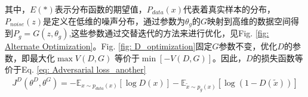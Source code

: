 \documentclass[letterpaper,12pt]{article}
\begin{document}
	其中，$E(*)$表示分布函数的期望值，$P_{data}(x)$代表着真实样本的分布，$P_{noise}(z)$是定义在低维的噪声分布，通过参数为$\theta_{g}$的$G$映射到高维的数据空间得到$P_g=G(z,\theta_{g})$,这些参数通过交替迭代的方法来进行优化，见Fig. \ref{fig: Alternate Optimization}。Fig. \ref{fig: D_optimization}固定$G$参数不变，优化$D$的参数，即最大化$\max V\left( D, G \right)$ 等价于$\min \left[ - V(D,G) \right]$。因此，$D$的损失函数等价于Eq. \ref{eq: Adversarial loss_another}
	\begin{equation}
		\begin{aligned}
			J^{D} \left( \theta^{D}, \theta^{G} \right) = -\mathbb{E}_{x \sim p_{data}(x)}\left[ \log D(x) \right] - \mathbb{E}_{\tilde{x} \sim p_{g}(x)}\left[ \log \left(1- D(\tilde{x})\right) \right]
		\end{aligned}
		\label{eq: Adversarial loss}
	\end{equation}
	
\end{document}
